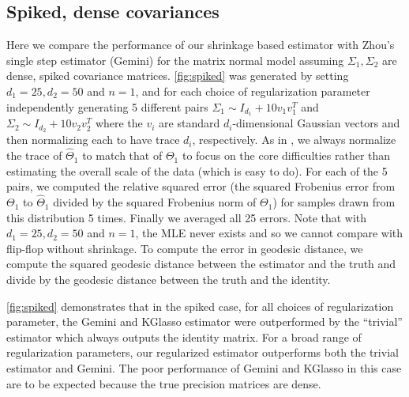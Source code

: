 \documentclass[aos]{imsart}
\theoremstyle{definition}
\numberwithin{equation}{section}
\newcommand{\htheta}{\widehat{\Theta}}
\newcommand{\CF}[1]{{\color{purple}[CF: #1]}}
\begin{document}
\subsection{Spiked, dense covariances}

Here we compare the performance of our shrinkage based estimator with Zhou's single step estimator (Gemini) for the matrix normal model assuming $\Sigma_1, \Sigma_2$ are dense, spiked covariance matrices. 
\cref{fig:spiked} was generated by setting $d_1 = 25, d_2 = 50$ and $n = 1$, and for each choice of regularization parameter independently generating 5 different pairs $\Sigma_1 \sim I_{d_1} + 10 v_1v_1^T$ and $\Sigma_2 \sim I_{d_2} + 10 v_2v_2^T$ where the $v_i$ are standard $d_i$-dimensional Gaussian vectors and then normalizing each to have trace $d_i$, respectively. As in \cite{zhou2014gemini}, we always normalize the trace of $\htheta_1$ to match that of $\Theta_1$ to focus on the core difficulties rather than estimating the overall scale of the data (which is easy to do). For each of the 5 pairs, we computed the relative squared error (the squared Frobenius error from $\Theta_1$ to $\htheta_1$ divided by the squared Frobenius norm of $\Theta_1$) for samples drawn from this distribution 5 times. Finally we averaged all 25 errors. Note that with $d_1 = 25, d_2 = 50$ and $n = 1$, the MLE never exists and so we cannot compare with flip-flop without shrinkage. To compute the error in geodesic distance, we compute the squared geodesic distance between the estimator and the truth and divide by the geodesic distance between the truth and the identity.

\cref{fig:spiked} demonstrates that in the spiked case, for all choices of regularization parameter, the Gemini and KGlasso estimator were outperformed by the ``trivial'' estimator which always outputs the identity matrix. For a broad range of regularization parameters, our regularized estimator outperforms both the trivial estimator and Gemini. The poor performance of Gemini and KGlasso in this case are to be expected because the true precision matrices are dense.

\end{document}
